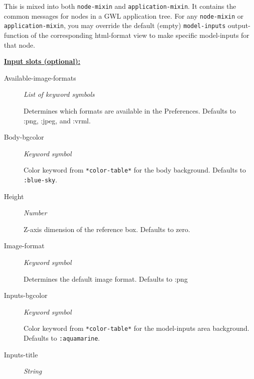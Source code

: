 \documentclass [11pt]{book}
\begin{document}
\begin{itemize}
\begin{description}
This is mixed into both \texttt{node-mixin} and \texttt{application-mixin}. It contains the common
messages for nodes in a GWL application tree. For any \texttt{node-mixin} or \texttt{application-mixin}, you may override the default (empty)
\texttt{model-inputs} output-function of the corresponding html-format view to make specific model-inputs for that node.



\end{description}








\textbf{
\underline{Input slots (optional):}}

\begin{description}

\item [Available-image-formats]
\emph{List of keyword symbols}

 Determines which formats are available in the Preferences. Defaults to :png, :jpeg, and :vrml.




\item [Body-bgcolor]
\emph{Keyword symbol}

 Color keyword from \texttt{*color-table*} for the body background. Defaults to \texttt{:blue-sky}.




\item [Height]
\emph{Number}

 Z-axis dimension of the reference box. Defaults to zero.




\item [Image-format]
\emph{Keyword symbol}

 Determines the default image format. Defaults to :png




\item [Inputs-bgcolor]
\emph{Keyword symbol}

 Color keyword from \texttt{*color-table*} for the model-inputs area background. Defaults to \texttt{:aquamarine}.




\item [Inputs-title]
\emph{String}


\end{description}
\end{itemize}
\end{document}
